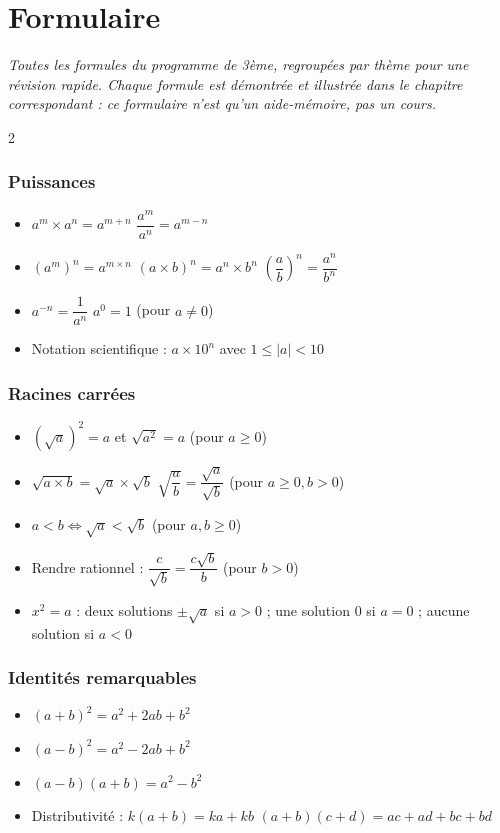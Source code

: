 \chapter{Formulaire}

\noindent\textit{Toutes les formules du programme de 3ème, regroupées par thème pour une
révision rapide. Chaque formule est démontrée et illustrée dans le chapitre correspondant :
ce formulaire n'est qu'un aide-mémoire, pas un cours.}
\vspace{8pt}

\begin{multicols}{2}

\subsection*{\color{onbo}Puissances}
\begin{itemize}
\item $a^{m}\times a^{n}=a^{m+n}$ \quad $\dfrac{a^{m}}{a^{n}}=a^{m-n}$
\item $(a^{m})^{n}=a^{m\times n}$ \quad $(a\times b)^{n}=a^{n}\times b^{n}$ \quad
$\left(\dfrac ab\right)^{n}=\dfrac{a^{n}}{b^{n}}$
\item $a^{-n}=\dfrac1{a^{n}}$ \quad $a^{0}=1$ (pour $a\ne0$)
\item Notation scientifique : $a\times10^{n}$ avec $1\le|a|<10$
\end{itemize}

\subsection*{\color{onbo}Racines carrées}
\begin{itemize}
\item $\left(\sqrt a\right)^{2}=a$ et $\sqrt{a^{2}}=a$ (pour $a\ge0$)
\item $\sqrt{a\times b}=\sqrt a\times\sqrt b$ \quad
$\sqrt{\dfrac ab}=\dfrac{\sqrt a}{\sqrt b}$ (pour $a\ge0,b>0$)
\item $a<b\iff\sqrt a<\sqrt b$ (pour $a,b\ge0$)
\item Rendre rationnel : $\dfrac{c}{\sqrt b}=\dfrac{c\sqrt b}{b}$ (pour $b>0$)
\item $x^{2}=a$ : deux solutions $\pm\sqrt a$ si $a>0$ ; une solution $0$ si $a=0$ ;
aucune solution si $a<0$
\end{itemize}

\subsection*{\color{onbo}Identités remarquables}
\begin{itemize}
\item $(a+b)^{2}=a^{2}+2ab+b^{2}$
\item $(a-b)^{2}=a^{2}-2ab+b^{2}$
\item $(a-b)(a+b)=a^{2}-b^{2}$
\item Distributivité : $k(a+b)=ka+kb$ \quad $(a+b)(c+d)=ac+ad+bc+bd$
\end{itemize}


\end{multicols}
